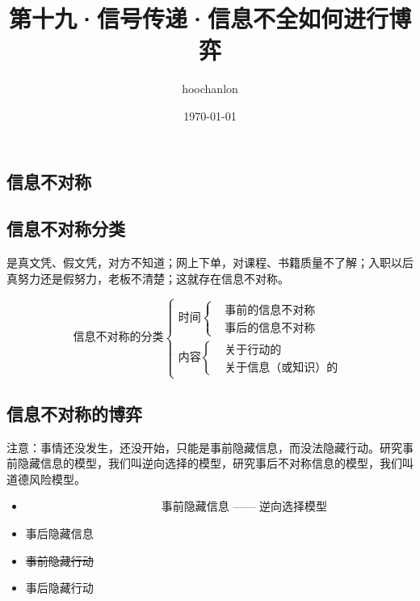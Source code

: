 \documentclass[12pt, a4paper]{article} %
\title{第十九·信号传递·信息不全如何进行博弈}
\author{hoochanlon}
\date{\today}
\begin{document}
	\begin{CJK*}{UTF8}{gbsn}
		\maketitle
        \clearpage
        \section{信息不对称}
        \subsection{信息不对称分类}
       是真文凭、假文凭，对方不知道；网上下单，对课程、书籍质量不了解；入职以后真努力还是假努力，老板不清楚；这就存在信息不对称。

       \[
        \text{信息不对称的分类}
        \begin{cases}
             \text{时间}\left\{
                \begin{aligned}
                    &\text{事前的信息不对称}  \\
                    &\text{事后的信息不对称}
                \end{aligned}
             \right. \\
             \text{内容}\left\{
                \begin{aligned}
                    &\text{关于行动的}  \\
                    &\text{关于信息（或知识）的}
                \end{aligned}
             \right.
        \end{cases}
    \]

    \subsection{信息不对称的博弈}

    注意：事情还没发生，还没开始，只能是事前隐藏信息，而没法隐藏行动。研究事前隐藏信息的模型，我们叫逆向选择的模型，研究事后不对称信息的模型，我们叫道德风险模型。
        \begin{itemize}
        \centering
        \item[] ~~~~~~~~~~~~~~~~~~~~~~~~事前隐藏信息 —— 逆向选择模型 
        \item[] 事后隐藏信息~ 
        \item[] \sout{事前隐藏行动}~ 
        \item[] 事后隐藏行动~ 
        \end{itemize}


\end{CJK*}
\end{document}
